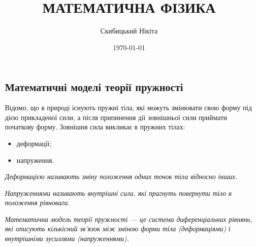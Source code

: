 

\title{{\Huge МАТЕМАТИЧНА ФІЗИКА}}
\author{Скибицький Нікіта}
\date{\today}





\tableofcontents

\setcounter{section}{3}
\setcounter{subsection}{1}
\setcounter{subsubsection}{4}
\setcounter{theorem}{15}
\setcounter{equation}{57}

\subsection{Математичні моделі теорії пружності}

Відомо, що в природі існують пружні тіла, які можуть змінювати свою форму під дією прикладеної сили, а після припинення дії зовнішньої сили приймати початкову форму. Зовнішня сила викликає в пружних тілах:
\begin{itemize}
	\item деформації;
	\item напруження.
\end{itemize}

\begin{definition}[деформації]
	\it{Деформацією} називають зміну положення одних точок тіла відносно інших.
\end{definition}

\begin{definition}[напружень]
	\it{Напруженнями} називають внутрішні сили, які прагнуть повернути тіло в положення рівноваги.
\end{definition}

\begin{definition}
	\it{Математична модель теорії пружності} --- це система диференціальних рівнянь, які описують кількісний зв'язок між зміною форми тіла (деформаціями) і внутрішніми зусиллями (напруженнями). 
\end{definition}

